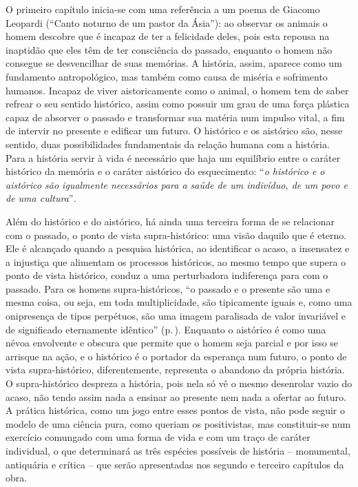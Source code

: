 O primeiro capítulo inicia-se com uma referência a um poema de Giacomo
Leopardi (``Canto noturno de um pastor da Ásia''): ao observar os
animais o homem descobre que é incapaz de ter a felicidade deles, pois
esta repousa na inaptidão que eles têm de ter consciência do passado,
enquanto o homem não consegue se desvencilhar de suas memórias. A
história, assim, aparece como um fundamento antropológico, mas também
como causa de miséria e sofrimento humanos. Incapaz de viver
aistoricamente como o animal, o homem tem de saber refrear o seu sentido
histórico, assim como possuir um grau de uma força plástica capaz de
absorver o passado e transformar sua matéria num impulso vital, a fim de
intervir no presente e edificar um futuro. O histórico e os aistórico
são, nesse sentido, duas possibilidades fundamentais da relação humana
com a história. Para a história servir à vida é necessário que haja um
equilíbrio entre o caráter histórico da memória e o caráter aistórico do
esquecimento: ``\emph{o histórico e o aistórico são igualmente
necessários para a saúde de um indivíduo, de um povo e de uma
cultura}''\emph{.}

Além do histórico e do aistórico, há ainda uma terceira forma de se
relacionar com o passado, o ponto de vista supra-histórico: uma visão
daquilo que é eterno. Ele é alcançado quando a pesquisa histórica, ao
identificar o acaso, a insensatez e a injustiça que alimentam os
processos históricos, ao mesmo tempo que supera o ponto de vista
histórico, conduz a uma perturbadora indiferença para com o passado.
Para os homens supra-históricos, ``o passado e o presente são uma e
mesma coisa, ou seja, em toda multiplicidade, são tipicamente iguais e,
como uma onipresença de tipos perpétuos, são uma imagem paralisada de
valor invariável e de significado eternamente idêntico'' (p.\,\pageref{eternamenteidentico}). Enquanto
o aistórico é como uma névoa envolvente e obscura que permite que o
homem seja parcial e por isso se arrisque na ação, e o histórico é o
portador da esperança num futuro, o ponto de vista supra-histórico,
diferentemente, representa o abandono da própria história. O
supra-histórico despreza a história, pois nela só vê o mesmo desenrolar
vazio do acaso, não tendo assim nada a ensinar ao presente nem nada a
ofertar ao futuro. A prática histórica, como um jogo entre esses pontos
de vista, não pode seguir o modelo de uma ciência pura, como queriam os
positivistas, mas constituir-se num exercício comungado com uma forma de
vida e com um traço de caráter individual, o que determinará as três
espécies possíveis de história -- monumental, antiquária e crítica --
que serão apresentadas nos segundo e terceiro capítulos da obra.

